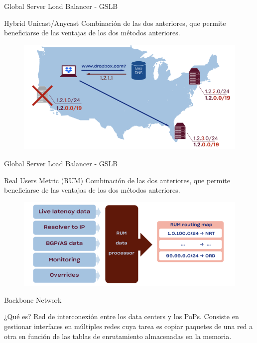 \documentclass[10pt]{beamer}
\begin{document}
\begin{frame}{Global Server Load Balancer - GSLB}
\begin{alertblock}{Hybrid Unicast/Anycast}
Combinación de las dos anteriores, que permite beneficiarse de las ventajas de los dos métodos anteriores.
\end{alertblock}
\begin{figure}[h]
  \centering
  \includegraphics[width=1\linewidth]{hybrid}
\end{figure}
\end{frame}

\begin{frame}{Global Server Load Balancer - GSLB}
\begin{alertblock}{Real Users Metric (RUM)}
Combinación de las dos anteriores, que permite beneficiarse de las ventajas de los dos métodos anteriores.
\end{alertblock}
\begin{figure}[h]
  \centering
  \includegraphics[width=1\linewidth]{rum}
\end{figure}
\end{frame}

\begin{frame}{Backbone Network}
\begin{alertblock}{¿Qué es?}
Red de interconexión entre los data centers y los PoPs. Consiste en gestionar interfaces en múltiples redes cuya tarea es copiar paquetes de una red a otra en función de las tablas de enrutamiento almacenadas en la memoria.
\end{alertblock}
\end{frame}
\end{document}
